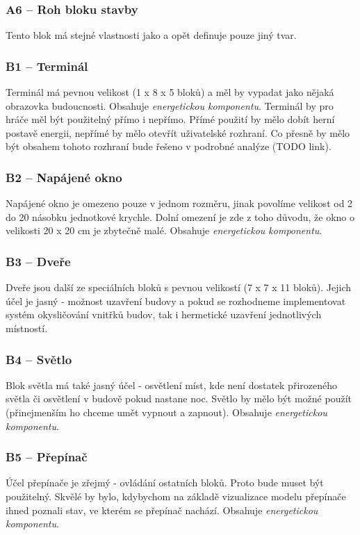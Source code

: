 \subsubsection{A6 -- Roh bloku stavby}
\label{blocks:A6}
Tento blok má stejné vlastnosti jako  a opět definuje pouze jiný tvar.



\subsubsection{B1 -- Terminál}
\label{blocks:B1}
Terminál má pevnou velikost (1 x 8 x 5 bloků) a měl by vypadat jako nějaká obrazovka budoucnosti.  Obsahuje \textit{energetickou komponentu}. Terminál by pro hráče měl být použitelný přímo i nepřímo. Přímé použití by mělo dobít herní postavě energii, nepřímé by mělo otevřít uživatelské rozhraní. Co přesně by mělo být obsahem tohoto rozhraní bude řešeno v podrobné analýze (TODO link).

\subsubsection{B2 -- Napájené okno}
\label{blocks:B2}
Napájené okno je omezeno pouze v jednom rozměru, jinak povolíme velikost od 2 do 20 násobku jednotkové krychle. Dolní omezení je zde z toho důvodu, že okno o velikosti 20 x 20 cm je zbytečně malé. Obsahuje \textit{energetickou komponentu}.


\subsubsection{B3 -- Dveře}
\label{blocks:B3}
Dveře jsou další ze speciálních bloků s pevnou velikostí (7 x 7 x 11 bloků). Jejich účel je jasný - možnost uzavření budovy a pokud se rozhodneme implementovat systém okysličování vnitřků budov, tak i hermetické uzavření jednotlivých místností.


\subsubsection{B4 -- Světlo}
\label{blocks:B4}
Blok světla má také jasný účel - osvětlení míst, kde není dostatek přirozeného světla či osvětlení v budově pokud nastane noc. Světlo by mělo být možné použít (přinejmenším ho chceme umět vypnout a zapnout). Obsahuje \textit{energetickou komponentu}. 


\subsubsection{B5 -- Přepínač}
\label{blocks:B5}
Účel přepínače je zřejmý  - ovládání ostatních bloků. Proto bude muset být použitelný. Skvělé by bylo, kdybychom na základě vizualizace modelu přepínače ihned poznali stav, ve kterém se přepínač nachází. Obsahuje \textit{energetickou komponentu}. 


